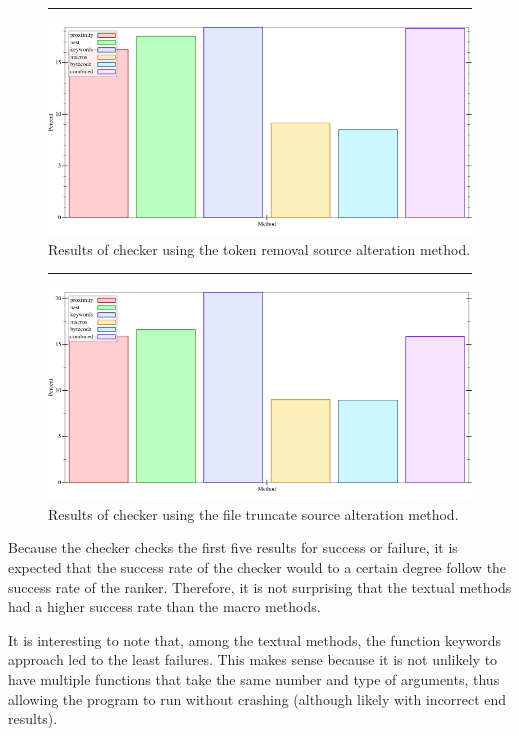 \documentclass[ms,electronic,twosidetoc,letterpaper,chaptercenter,parttop,lol,lof,lot]{byumsphd}
\begin{document}
\begin{figure}[h]
\centering
\hrule
\includegraphics[width=1.0\textwidth]{../output/synthesis/checker/Remove-Percent.png}
\caption{Results of checker using the token removal source alteration method.}
\label{checker-remove-percent}
\end{figure}

\begin{figure}[h]
\centering
\hrule
\includegraphics[width=1.0\textwidth]{../output/synthesis/checker/Truncate-Percent.png}
\caption{Results of checker using the file truncate source alteration method.}
\label{checker-truncate-percent}
\end{figure}

Because the checker checks the first five results for success or failure, it is expected that the success rate of the checker would to a certain degree follow the success rate of the ranker.
Therefore, it is not surprising that the textual methods had a higher success rate than the macro methods.

It is interesting to note that, among the textual methods, the function keywords approach led to the least failures.
This makes sense because it is not unlikely to have multiple functions that take the same number and type of arguments, thus allowing the program to run without crashing (although likely with incorrect end results).
\end{document}
